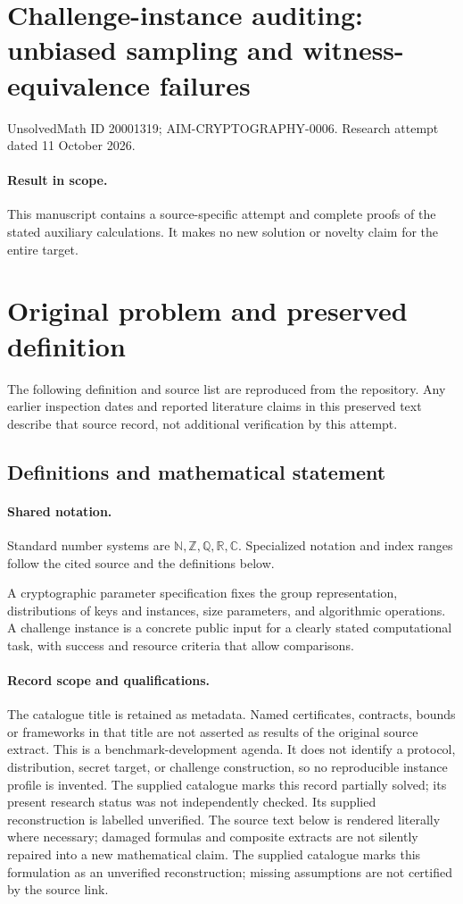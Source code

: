 \documentclass[11pt]{article}
\begin{document}
\section*{Challenge-instance auditing: unbiased sampling and witness-equivalence failures}
\noindent UnsolvedMath ID 20001319; AIM-CRYPTOGRAPHY-0006. Research attempt dated 11 October 2026.
\paragraph{Result in scope.}This manuscript contains a source-specific attempt and complete proofs of the stated auxiliary calculations. It makes no new solution or novelty claim for the entire target.
\section{Original problem and preserved definition}
The following definition and source list are reproduced from the repository. Any earlier inspection dates and reported literature claims in this preserved text describe that source record, not additional verification by this attempt.
\subsection{Definitions and mathematical statement}

\paragraph{Shared notation.}Standard number systems are $\mathbb N,\mathbb Z,\mathbb Q,\mathbb R,\mathbb C$. Specialized notation and index ranges follow the cited source and the definitions below.


A cryptographic parameter specification fixes the group representation, distributions of keys and instances, size parameters, and algorithmic operations. A challenge instance is a concrete public input for a clearly stated computational task, with success and resource criteria that allow comparisons.
\paragraph{Record scope and qualifications.}
The catalogue title is retained as metadata. Named certificates, contracts, bounds or frameworks in that title are not asserted as results of the original source extract.
This is a benchmark-development agenda. It does not identify a protocol, distribution, secret target, or challenge construction, so no reproducible instance profile is invented. The supplied catalogue marks this record partially solved; its present research status was not independently checked. Its supplied reconstruction is labelled unverified.
The source text below is rendered literally where necessary; damaged formulas and composite extracts are not silently repaired into a new mathematical claim.
The supplied catalogue marks this formulation as an unverified reconstruction; missing assumptions are not certified by the source link.
\end{document}
